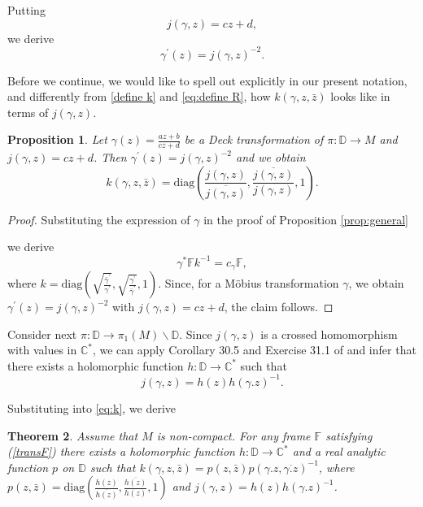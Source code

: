 \documentclass[a4paper,11pt]{amsart}
\newtheorem{theorem}{Theorem}[section]
\newtheorem{proposition}[theorem]{Proposition}
\theoremstyle{definition}
\numberwithin{equation}{section}
\newcommand{\C}{\mathbb{C}}
\newcommand{\D}{\mathbb{D}}
\begin{document}
Putting 
\begin{equation}
    j(\gamma,z) = cz + d,
\end{equation}
we derive
\begin{equation}
    \gamma^\prime (z) = j(\gamma, z) ^{-2}.
\end{equation}


Before we continue, we would like to spell out explicitly in our present notation,
 and differently from  \eqref{define k} and \eqref{eq:define R},
how $k(\gamma, z, \bar z)$ looks like in terms of $j(\gamma, z).$

\begin{proposition} \label{exolicitk}
Let  $\gamma(z) = \frac{az + b}{cz + d}$ be a Deck transformation of $\pi: \D\rightarrow M$ and $  j(\gamma,z) = cz + d$. Then $ \gamma^\prime (z) = j(\gamma, z) ^{-2}$ and we obtain
\begin{equation}\label{eq:k}
k(\gamma, z, \bar z )=\mathrm{diag}(\frac{j(\gamma, z)}{\overline{j(\gamma, z)}}, \frac{\overline{j(\gamma, z)}}{j(\gamma, z)}, 1).
\end{equation}

\end{proposition}
\begin{proof}


Substituting the expression of $\gamma$ in the proof of Proposition \ref{prop:general}

we derive 
$$\gamma^* \mathbb{F} k^{-1} = c_\gamma \mathbb{F},$$
where $k=\mathrm{diag}(\sqrt{\frac{\bar{\gamma}^{\prime}}{\gamma^{\prime}}},\sqrt{\frac{\gamma^{\prime}}{\bar{\gamma}^{\prime}}},1)$.
Since, for a M\"{o}bius transformation $\gamma$, we obtain $\gamma^{\prime}(z)=j(\gamma, z)^{-2}$ with $j(\gamma, z)=cz+d$, the claim follows. 
\end{proof}


Consider next $\pi: \D\rightarrow \pi_1(M) \backslash {\D}$. 
Since  $j(\gamma, z)$ is a crossed homomorphism with values in $\C^*$, we can apply Corollary 30.5 and Exercise 31.1 of \cite{Forster} and infer that there exists  a holomorphic function $h:\D\rightarrow \C^*$ such that
\begin{equation}\label{eq:j-spliting}
j(\gamma, z)=h(z)h(\gamma. z)^{-1}.
\end{equation}

Substituting into  \eqref{eq:k}, we derive

\begin{theorem}
Assume that $M$ is non-compact. For any frame $\mathbb{F}$ satisfying (\ref{transF}) 
there exists  a holomorphic function $h:\D\rightarrow \C^*$ and a real analytic function $p$ on $\D$ such that 
$k(\gamma, z, \bar z)=p(z, \bar{z})p(\gamma . z, \overline{\gamma . z})^{-1}$, where 
$p(z, \bar{z})=\mathrm{diag}(\frac{h(z)}{\overline{h(z)}}, \frac{\overline{h(z)}}{h(z)}, 1)$ and $j(\gamma, z)=h(z)h(\gamma.z)^{-1}$. 
\end{theorem}
\end{document}
